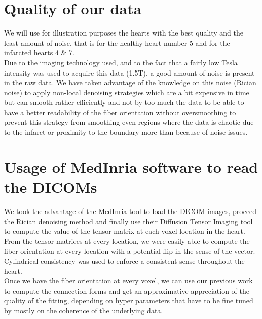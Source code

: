 \section{Quality of our data}

We will use for illustration purposes the hearts with the best quality and the least amount of noise, that is for the healthy heart number 5 and for the infarcted hearts 4 \& 7. \\
Due to the imaging technology used, and to the fact that a fairly low Tesla intensity was used to acquire this data (1.5T), a good amount of noise is present in the raw data. We have taken advantage of the knowledge on this noise (Rician noise) to apply non-local denoising strategies which are a bit expensive in time but can smooth rather efficiently and not by too much the data to be able to have a better readability of the fiber orientation without oversmoothing to prevent this strategy from smoothing even regions where the data is chaotic due to the infarct or proximity to the boundary more than because of noise issues.

\section{Usage of MedInria software to read the DICOMs}

We took the advantage of the MedInria tool to load the DICOM images, proceed the Rician denoising method and finally use their Diffusion Tensor Imaging tool to compute the value of the tensor matrix at each voxel location in the heart. \\
From the tensor matrices at every location, we were easily able to compute the fiber orientation at every location with a potential flip in the sense of the vector. Cylindrical consistency was used to enforce a consistent sense throughout the heart. \\
Once we have the fiber orientation at every voxel, we can use our previous work to compute the connection forms and get an approximative appreciation of the quality of the fitting, depending on hyper parameters that have to be fine tuned by mostly on the coherence of the underlying data.